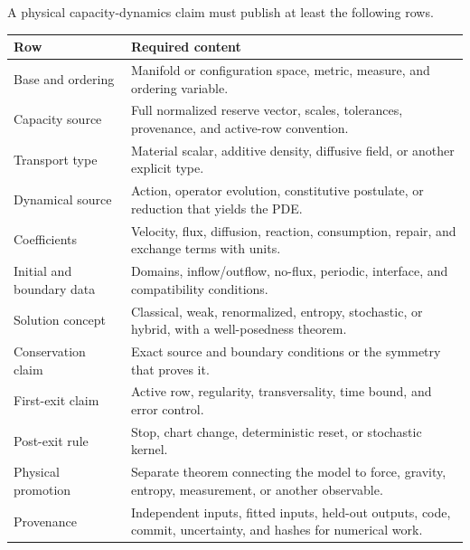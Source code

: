 \documentclass[11pt]{article}
\theoremstyle{definition}
\theoremstyle{remark}
\begin{document}
A physical capacity-dynamics claim must publish at least the following
rows.

\begin{center}
\begin{tabularx}{\textwidth}{@{}L{0.25\textwidth}Y@{}}
\toprule
Row & Required content \\
\midrule
Base and ordering
& Manifold or configuration space, metric, measure, and ordering variable.\\

Capacity source
& Full normalized reserve vector, scales, tolerances, provenance, and
  active-row convention.\\

Transport type
& Material scalar, additive density, diffusive field, or another explicit
  type.\\

Dynamical source
& Action, operator evolution, constitutive postulate, or reduction that
  yields the PDE.\\

Coefficients
& Velocity, flux, diffusion, reaction, consumption, repair, and exchange
  terms with units.\\

Initial and boundary data
& Domains, inflow/outflow, no-flux, periodic, interface, and compatibility
  conditions.\\

Solution concept
& Classical, weak, renormalized, entropy, stochastic, or hybrid, with a
  well-posedness theorem.\\

Conservation claim
& Exact source and boundary conditions or the symmetry that proves it.\\

First-exit claim
& Active row, regularity, transversality, time bound, and error control.\\

Post-exit rule
& Stop, chart change, deterministic reset, or stochastic kernel.\\

Physical promotion
& Separate theorem connecting the model to force, gravity, entropy,
  measurement, or another observable.\\

Provenance
& Independent inputs, fitted inputs, held-out outputs, code, commit,
  uncertainty, and hashes for numerical work.\\
\bottomrule
\end{tabularx}
\end{center}
\end{document}
